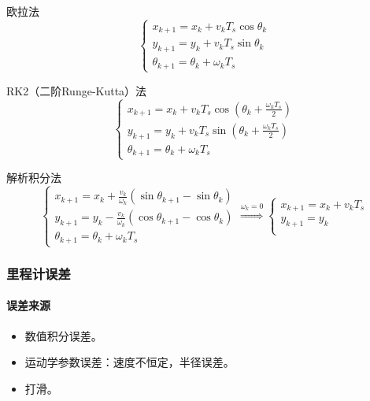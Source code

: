 \documentclass[
12pt, %
a4paper, 
oneside, %
headinclude,footinclude, %
]{scrartcl}
\begin{document}
\begin{itemize}
\begin{minipage}{0.5\textwidth}
\item 欧拉法
$$
\begin{cases}
x_{k + 1} = x_k + v_k T_s \cos \theta_k \\
y_{k + 1} = y_k + v_k T_s \sin \theta_k \\
\theta_{k + 1} = \theta_k + \omega_k T_s
\end{cases}   
$$
\end{minipage}
\begin{minipage}{0.5\textwidth}
\item RK2（二阶Runge-Kutta）法
$$
\begin{cases}
x_{k + 1} = x_k + v_k T_s \cos(\theta_k + \frac{\omega_k T_s}{2}) \\
y_{k + 1} = y_k + v_k T_s \sin(\theta_k + \frac{\omega_k T_s}{2}) \\
\theta_{k + 1} = \theta_k + \omega_k T_s
\end{cases}  
$$
\end{minipage}
\item 解析积分法
$$
\begin{cases}
x_{k + 1} = x_k + \frac{v_k}{\omega_k} (\sin \theta_{k + 1} - \sin \theta_k) \\
y_{k + 1} = y_k - \frac{v_k}{\omega_k} (\cos \theta_{k + 1} - \cos \theta_k) \\
\theta_{k + 1} = \theta_k + \omega_k T_s
\end{cases} 
\overset{\omega_k = 0}{\Longrightarrow}
\begin{cases}
x_{k + 1} = x_k + v_k T_s \\
y_{k + 1} = y_k \\
\end{cases}  
$$
\end{itemize}
\subsubsection[里程计误差]{里程计误差}
\paragraph{误差来源}
\begin{itemize}
\item 数值积分误差。
\item 运动学参数误差：速度不恒定，半径误差。
\item 打滑。
\end{itemize}
\end{document}
